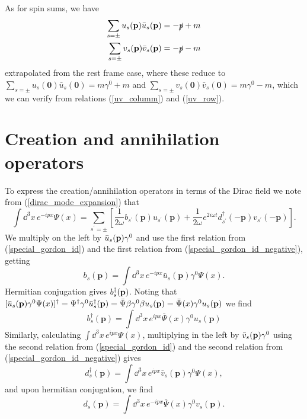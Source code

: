 As for spin sums, we have
\begin{equation}
\begin{aligned}
\sum_{s=\pm} u_{s}(\mathbf{p}) \bar{u}_{s}(\mathbf{p})&=-\slashed{p}+m \\
\sum_{s=\pm} v_{s}(\mathbf{p}) \bar{v}_{s}(\mathbf{p})&=-\slashed{p}-m
\end{aligned}
\label{spin_sum}
\end{equation}
extrapolated from the rest frame case, where these reduce to  $\sum_{s=\pm} u_{s}(\mathbf{0}) \bar{u}_{s}(\mathbf{0})=m \gamma^{0}+m$ and $\sum_{s=\pm} v_{s}(\mathbf{0}) \bar{v}_{s}(\mathbf{0})=m \gamma^{0}-m$, which we can verify from relations (\ref{uv_columm}) and (\ref{uv_row}).
\section{Creation and annihilation operators}
To express the creation/annihilation operators in terms of the Dirac field we note from (\ref{dirac_mode_expansion}) that   
\begin{equation}
\int \dd^{3} x\, e^{-i p x} \Psi(x)=\sum_{s^{\prime}=\pm}\left[\frac{1}{2 \omega} b_{s^{\prime}}(\mathbf{p}) u_{s^{\prime}}(\mathbf{p})+\frac{1}{2 \omega} e^{2 i \omega t} d_{s^{\prime}}^{\dagger}(-\mathbf{p}) v_{s^{\prime}}(-\mathbf{p})\right].
\end{equation}
We multiply on the left by $\bar{u}_s(\vb{p})\gamma^0$ and use the first relation from  (\ref{special_gordon_id}) and the first relation from (\ref{special_gordon_id_negative}), getting
\begin{equation}
b_{s}(\mathbf{p})=\int \dd^{3} x\, e^{-i p x} \bar{u}_{s}(\mathbf{p}) \gamma^{0} \Psi(x).
\end{equation}
Hermitian conjugation gives $b^\dagger_s(\vb{p})$. Noting that $[\bar{u}_s(\vb{p})\gamma^0\Psi(x)]^\dagger=\Psi^\dagger\gamma^0\bar{u}_s^\dagger(\vb{p})=\bar{\Psi}\beta\gamma^0\beta u_s(\vb{p})=\bar{\Psi}(x)\gamma^0u_s(\vb{p})$ we find
\begin{equation}
b_{s}^\dagger(\mathbf{p})=\int \dd^{3} x\, e^{i p x} \bar{\Psi}(x)\gamma^0u_s(\mathbf{p})
\label{bdagger_psi}
\end{equation}
Similarly, calculating $\int \dd^{3} x\, e^{i p x} \Psi(x)$, multiplying in the left by $\bar{v}_s(\vb{p})\gamma^0$ using the second relation from (\ref{special_gordon_id}) and the second relation from (\ref{special_gordon_id_negative}) gives
\begin{equation}
d^\dagger_{s}(\mathbf{p})=\int \dd^{3} x\, e^{i p x} \bar{v}_{s}(\mathbf{p}) \gamma^{0} \Psi(x),
\end{equation}
and upon hermitian conjugation, we find
\begin{equation}
d_{s}(\mathbf{p})=\int \dd^{3} x\, e^{-i p x} \bar{\Psi}(x)\gamma^0v_s(\mathbf{p}).
\end{equation}

